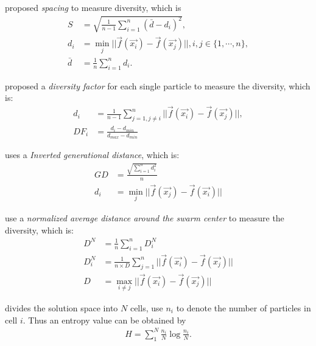\documentclass[12pt]{article}
\begin{document}
\cite{risco2008optimization} proposed \emph{spacing} to measure diversity, which is 
\begin{equation}
\begin{aligned}
S & = \sqrt{\frac{1}{n-1}\sum_{i=1}^{n}(\bar{d}-d_{i})^{2}}, \\
d_{i} & = \min_{j} || \vec{f}(\vec{x_{i}}) - \vec{f}(\vec{x_{j}}) ||, i,j \in \{ 1, \cdots , n \}, \\
\bar{d} & = \frac{1}{n} \sum_{i=1}^{n} d_{i}.
\end{aligned}
\end{equation}

\cite{silva2013multi} proposed a \emph{diversity factor} for each single particle to measure the diversity, which is:
\begin{equation}
\begin{aligned}
d_{i} & = \frac{1}{n-1} \sum_{j=1, j \neq i}^{n} || \vec{f}(\vec{x_{i}}) - \vec{f}(\vec{x_{j}}) ||, \\
DF_{i} & = \frac{ d_{i} - d_{min} }{ d_{max} - d_{min} }
\end{aligned}
\end{equation}

\cite{coello2005solving} uses a \emph{Inverted generational distance}, which is:
\begin{equation}
\begin{aligned}
GD & = \frac{\sqrt{\sum_{i=1}^{n} d_{i}^{2} }}{n} \\
d_{i} & = \min_{j} || \vec{f}(\vec{x_{j}}) - \vec{f}(\vec{x_{i}}) ||
\end{aligned}
\end{equation}

\cite{olorunda2008measuring} use a \emph{normalized average distance around the swarm center} to measure the diversity, which is:
\begin{equation}
\begin{aligned}
D^{N} & = \frac{1}{n} \sum_{i=1}^{n} D^{N}_{i} \\
D^{N}_{i} & = \frac{1}{n \times D} \sum_{j=1}^{n} || \vec{f}( \vec{x_{i}} ) - \vec{f}( \vec{x_{j}} ) || \\
D & = \max_{i \neq j} || \vec{f}( \vec{x_{i}} ) - \vec{f}( \vec{x_{j}} ) ||
\end{aligned}
\end{equation}

\cite{pires2013entropy} divides the solution space into $ N $ cells, use $ n_{i} $ to denote the number of particles in cell $ i $. Thus an entropy value can be obtained by
\begin{equation}
\begin{aligned}
H = \sum_{1}^{N} \frac{n_{i}}{N} \log{ \frac{n_{i}}{N} }.
\end{aligned}
\end{equation}
\end{document}
